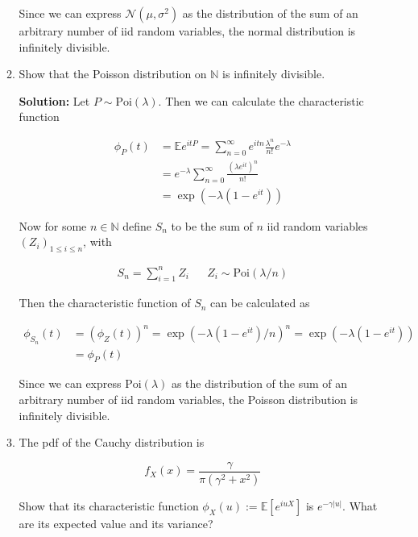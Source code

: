 \documentclass[12pt, a4paper]{article}
\begin{document}
\begin{enumerate}
\begin{enumerate}
            Since we can express $\mathcal N(\mu, \sigma^2)$ as the distribution of the sum of an arbitrary number of iid random variables, the normal distribution is infinitely divisible.


            \item Show that the Poisson distribution on $\mathbb N$ is infinitely divisible.
            
            \textbf{Solution:} Let $P \sim \text{Poi}(\lambda)$. Then we can calculate the characteristic function 

            \begin{align*}
                \phi_P(t) &= \mathbb Ee^{itP} = \sum_{n=0}^\infty e^{itn} \frac{\lambda^n}{n!}e^{-\lambda} \\
                &= e^{-\lambda} \sum_{n=0}^\infty \frac{(\lambda e^{it})^n}{n!} \\
                &= \exp(-\lambda(1-e^{it}))
            \end{align*}

            Now for some $n \in \mathbb N$ define $S_n$ to be the sum of $n$ iid random variables $(Z_i)_{1 \le i \le n}$, with

            \begin{align*}
                S_n = \sum_{i=1}^n Z_i && Z_i \sim \text{Poi}(\lambda/n)
            \end{align*}

            Then the characteristic function of $S_n$ can be calculated as 

            \begin{align*}
                \phi_{S_n}(t) &= (\phi_Z(t))^n = \exp(-\lambda(1-e^{it})/n)^n = \exp(-\lambda(1-e^{it})) \\
                &= \phi_P(t)
            \end{align*}

            Since we can express $\text{Poi}(\lambda)$ as the distribution of the sum of an arbitrary number of iid random variables, the Poisson distribution is infinitely divisible.

            \item The pdf of the Cauchy distribution is 
            
            $$f_X(x) = \frac{\gamma}{\pi (\gamma^2 + x^2)}$$ 
            
            Show that its characteristic function $\phi_X(u) := \mathbb E\left[ e^{iuX} \right]$ is $e^{-\gamma |u|}$. What are its expected value and its variance?


\end{enumerate}
\end{enumerate}
\end{document}
